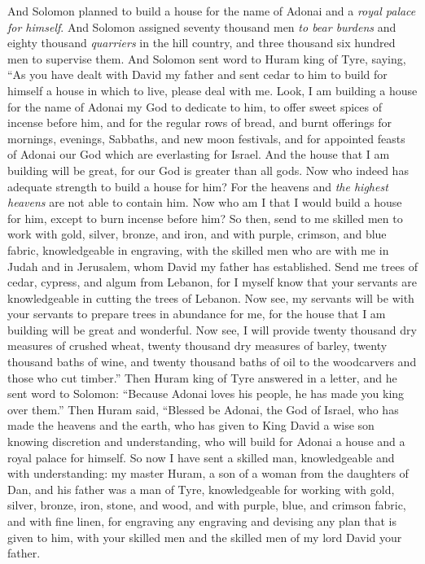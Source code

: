 \begin{biblechapter} %
  And Solomon planned to build a house for the name of Adonai and a \textit{royal palace for himself}.
\verse And Solomon assigned seventy thousand men \textit{to bear burdens} and eighty thousand \textit{quarriers} in the hill country, and three thousand six hundred men to supervise them.
\verse And Solomon sent word to Huram king of Tyre, saying, “As you have dealt with David my father and sent cedar to him to build for himself a house in which to live, please deal with me.
\verse Look, I am building a house for the name of Adonai my God to dedicate to him, to offer sweet spices of incense before him, and for the regular rows of bread, and burnt offerings for mornings, evenings, Sabbaths, and new moon festivals, and for appointed feasts of Adonai our God which are everlasting for Israel.
\verse And the house that I am building will be great, for our God is greater than all gods.
\verse Now who indeed has adequate strength to build a house for him? For the heavens and \textit{the highest heavens} are not able to contain him. Now who am I that I would build a house for him, except to burn incense before him?
\verse So then, send to me skilled men to work with gold, silver, bronze, and iron, and with purple, crimson, and blue fabric, knowledgeable in engraving, with the skilled men who are with me in Judah and in Jerusalem, whom David my father has established.
\verse Send me trees of cedar, cypress, and algum from Lebanon, for I myself know that your servants are knowledgeable in cutting the trees of Lebanon. Now see, my servants will be with your servants
\verse to prepare trees in abundance for me, for the house that I am building will be great and wonderful.
\verse Now see, I will provide twenty thousand dry measures of crushed wheat, twenty thousand dry measures of barley, twenty thousand baths of wine, and twenty thousand baths of oil to the woodcarvers and those who cut timber.”
\verse Then Huram king of Tyre answered in a letter, and he sent word to Solomon: “Because Adonai loves his people, he has made you king over them.”
\verse Then Huram said, “Blessed be Adonai, the God of Israel, who has made the heavens and the earth, who has given to King David a wise son knowing discretion and understanding, who will build for Adonai a house and a royal palace for himself.
\verse So now I have sent a skilled man, knowledgeable and with understanding: my master Huram,
\verse a son of a woman from the daughters of Dan, and his father was a man of Tyre, knowledgeable for working with gold, silver, bronze, iron, stone, and wood, and with purple, blue, and crimson fabric, and with fine linen, for engraving any engraving and devising any plan that is given to him, with your skilled men and the skilled men of my lord David your father.

\end{biblechapter}

